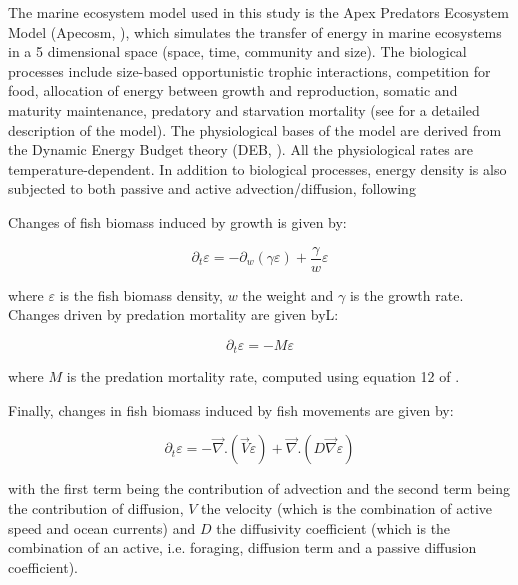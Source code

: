 The marine ecosystem model used in this study is the Apex Predators Ecosystem Model (Apecosm, \citealt{mauryModelingEnvironmentalEffects2007, mauryOverviewAPECOSMSpatialized2010}), which simulates the transfer of energy in marine ecosystems in a 5 dimensional space (space, time, community and size). The biological processes include size-based opportunistic trophic interactions, competition for food, allocation of energy between growth and reproduction, somatic and maturity maintenance, predatory and starvation mortality (see \citealt{mauryModelingEnvironmentalEffects2007} for a detailed description of the model). The physiological bases of the model are derived from the Dynamic Energy Budget theory (DEB, \citealt{kooijmanDynamicEnergyMass2000}). All the physiological rates are temperature-dependent. In addition to biological processes, energy density is also subjected to both passive and active advection/diffusion, following \cite{faugerasAdvectiondiffusionreactionSizestructuredFish2005}

Changes of fish biomass induced by growth is given by:

\begin{equation}
\partial_t \varepsilon = - \partial_w(\gamma \varepsilon) + \frac{\gamma}{w}\varepsilon
\label{eq:growth}
\end{equation}

where $\varepsilon$  is the fish biomass density, $w$ the weight and $\gamma$ is the growth rate. Changes driven by predation mortality are given byL:

\begin{equation}
\partial_t \varepsilon = - M \varepsilon
\label{eq:pred}
\end{equation}

where $M$ is the predation mortality rate, computed using equation 12 of \cite{mauryIndividualsPopulationsCommunities2013}. 

Finally, changes in fish biomass induced by fish movements are given by:

\begin{equation}
\partial_t \varepsilon = -\overrightarrow{\nabla}.(\overrightarrow{V} \varepsilon) + \overrightarrow{\nabla} . (D \overrightarrow{\nabla} \varepsilon)
\label{eq:move}
\end{equation}

with the first term being the contribution of advection and the second term being the contribution of diffusion, $V$ the velocity (which is the combination of active speed and ocean currents) and $D$ the diffusivity coefficient (which is the combination of an active, i.e. foraging, diffusion term and a passive diffusion coefficient).

